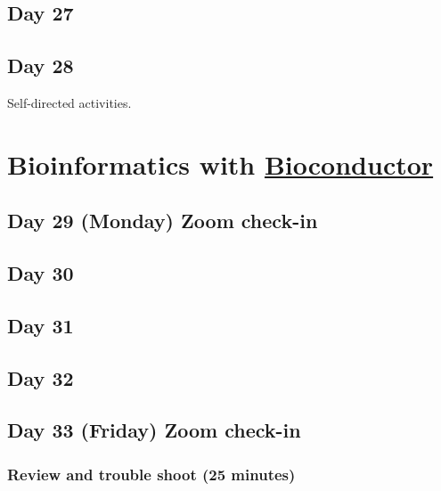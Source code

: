 \documentclass[]{book}
\begin{document}
\hypertarget{day-27}{%
\section{Day 27}\label{day-27}}

\hypertarget{day-28}{%
\section{Day 28}\label{day-28}}

Self-directed activities.

\hypertarget{five}{%
\chapter{\texorpdfstring{Bioinformatics with \href{https://bioconductor.org}{Bioconductor}}{Bioinformatics with Bioconductor}}\label{five}}

\hypertarget{day-29-monday-zoom-check-in}{%
\section{Day 29 (Monday) Zoom check-in}\label{day-29-monday-zoom-check-in}}

\hypertarget{day-30}{%
\section{Day 30}\label{day-30}}

\hypertarget{day-31}{%
\section{Day 31}\label{day-31}}

\hypertarget{day-32}{%
\section{Day 32}\label{day-32}}

\hypertarget{day-33-friday-zoom-check-in}{%
\section{Day 33 (Friday) Zoom check-in}\label{day-33-friday-zoom-check-in}}

\hypertarget{review-and-trouble-shoot-25-minutes-2}{%
\subsection{Review and trouble shoot (25 minutes)}\label{review-and-trouble-shoot-25-minutes-2}}
\end{document}
